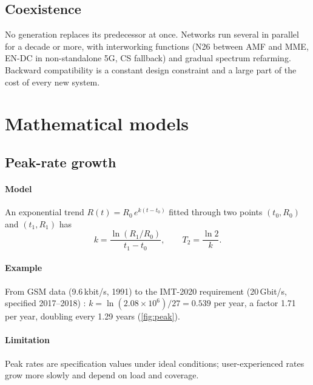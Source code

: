 \documentclass[11pt,a4paper]{article}
\begin{document}
\subsection{Coexistence}
No generation replaces its predecessor at once. Networks run several in parallel for a decade or more, with interworking functions (N26 between
AMF and MME, EN-DC in non-standalone 5G, CS fallback) and gradual spectrum refarming. Backward compatibility is a constant design constraint and a
large part of the cost of every new system.

\section{Mathematical models}

\subsection{Peak-rate growth}\label{sec:peak}
\paragraph{Model} An exponential trend $R(t) = R_0\, e^{k (t - t_0)}$ fitted through two points $(t_0, R_0)$ and $(t_1, R_1)$ has
\begin{equation}\label{eq:growth}
  k = \frac{\ln (R_1/R_0)}{t_1 - t_0}, \qquad T_2 = \frac{\ln 2}{k} .
\end{equation}
\paragraph{Example} From GSM data (9.6\,kbit/s, 1991) to the IMT-2020 requirement (20\,Gbit/s, specified 2017--2018) \cite{itu2017m2410}:
$k = \ln(2.08\times10^{6})/27 = 0.539$ per year, a factor 1.71 per year, doubling every 1.29 years (\cref{fig:peak}).
\paragraph{Limitation} Peak rates are specification values under ideal conditions; user-experienced rates grow more slowly and depend on load and
coverage.

\begin{acnfigure}
  \caption{Specified downlink peak rates of 3GPP technologies and the exponential fit of \cref{eq:growth}.}
  \label{fig:peak}
\end{acnfigure}
\end{document}
